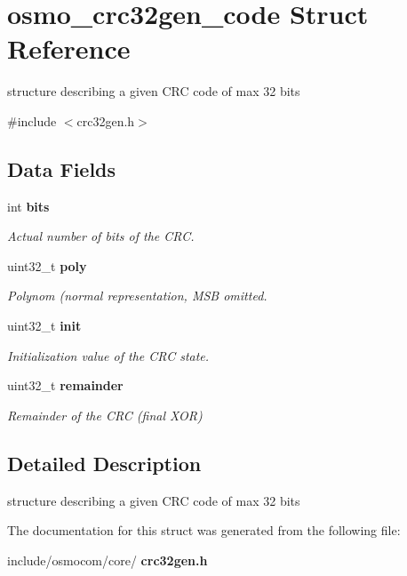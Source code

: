 \section{osmo\+\_\+crc32gen\+\_\+code Struct Reference}
\label{structosmo__crc32gen__code}


structure describing a given C\+RC code of max 32 bits  




{\ttfamily \#include $<$crc32gen.\+h$>$}

\subsection*{Data Fields}
\begin{DoxyCompactItemize}
\item 
\mbox{\label{structosmo__crc32gen__code_ab7ea0542721265f02d540fc95fb48fda}} 
int \textbf{ bits}
\begin{DoxyCompactList}\small\item\em Actual number of bits of the C\+RC. \end{DoxyCompactList}\item 
\mbox{\label{structosmo__crc32gen__code_a38fbc53e41d3181a2123c62253f9ee25}} 
uint32\+\_\+t \textbf{ poly}
\begin{DoxyCompactList}\small\item\em Polynom (normal representation, M\+SB omitted. \end{DoxyCompactList}\item 
\mbox{\label{structosmo__crc32gen__code_ad139d035aff276d724db17c41b2147d8}} 
uint32\+\_\+t \textbf{ init}
\begin{DoxyCompactList}\small\item\em Initialization value of the C\+RC state. \end{DoxyCompactList}\item 
\mbox{\label{structosmo__crc32gen__code_aa0fc5a5c0a648855bae5d975fc8829c1}} 
uint32\+\_\+t \textbf{ remainder}
\begin{DoxyCompactList}\small\item\em Remainder of the C\+RC (final X\+OR) \end{DoxyCompactList}\end{DoxyCompactItemize}


\subsection{Detailed Description}
structure describing a given C\+RC code of max 32 bits 

The documentation for this struct was generated from the following file\+:\begin{DoxyCompactItemize}
\item 
include/osmocom/core/\textbf{ crc32gen.\+h}\end{DoxyCompactItemize}
